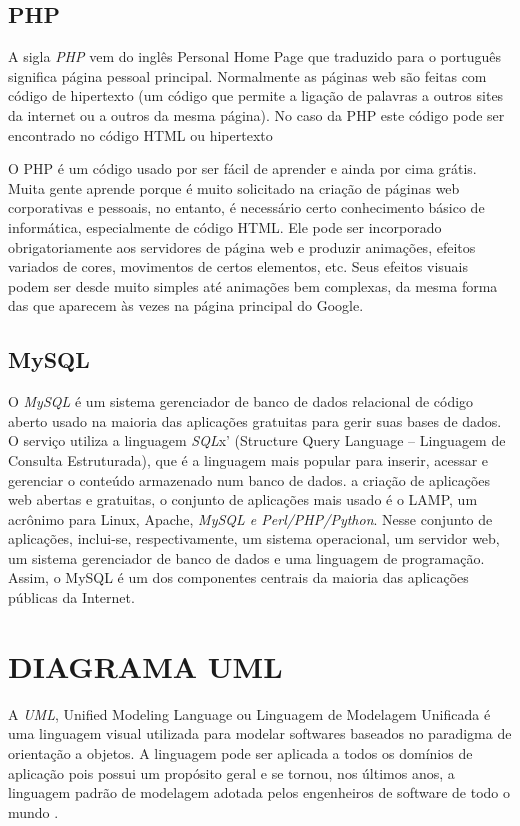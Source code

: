 \section{PHP}

A sigla  \textit{PHP} vem do inglês Personal Home Page que traduzido para o português significa página pessoal principal. Normalmente as páginas web são feitas com código de hipertexto (um código que permite a ligação de palavras a outros sites da internet ou a outros da mesma página). No caso da PHP este código pode ser encontrado no código HTML ou hipertexto

O PHP é um código usado por ser fácil de aprender e ainda por cima grátis. Muita gente aprende porque é muito solicitado na criação de páginas web corporativas e pessoais, no entanto, é necessário certo conhecimento básico de informática, especialmente de código HTML. Ele pode ser incorporado obrigatoriamente aos servidores de página web e produzir animações, efeitos variados de cores, movimentos de certos elementos, etc. Seus efeitos visuais podem ser desde muito simples até animações bem complexas, da mesma forma das que aparecem às vezes na página principal do Google. \cite{php}

\section{MySQL}

O  \textit{MySQL} é um sistema gerenciador de banco de dados relacional de código aberto usado na maioria das aplicações gratuitas para gerir suas bases de dados. O serviço utiliza a linguagem  \textit{SQL}x' (Structure Query Language – Linguagem de Consulta Estruturada), que é a linguagem mais popular para inserir, acessar e gerenciar o conteúdo armazenado num banco de dados.
a criação de aplicações web abertas e gratuitas, o conjunto de aplicações mais usado é o LAMP, um acrônimo para Linux, Apache, \textit{MySQL e Perl/PHP/Python}. Nesse conjunto de aplicações, inclui-se, respectivamente, um sistema operacional, um servidor web, um sistema gerenciador de banco de dados e uma linguagem de programação. Assim, o MySQL é um dos componentes centrais da maioria das aplicações públicas da Internet. \cite{mysql}



\chapter{DIAGRAMA UML}
\label{chap:diauml}
A \textit{UML}, Unified Modeling Language ou Linguagem de Modelagem Unificada é uma linguagem visual utilizada para modelar softwares baseados no paradigma de orientação a objetos. A linguagem pode ser aplicada a todos os domínios de aplicação pois possui um propósito geral e se tornou, nos últimos anos, a linguagem padrão de modelagem adotada pelos engenheiros de software de todo o mundo \cite{Guedes}.

